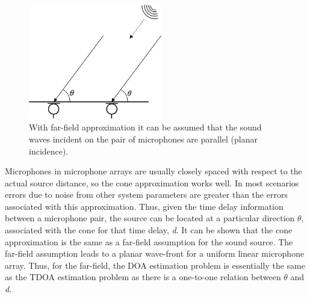\begin{figure}[H]
    \centering
    \includegraphics[width=0.52\textwidth]{Figures/farfieldtheta.png}
    \caption{With far-field approximation it can be assumed that the sound waves incident on the pair of microphones are parallel (planar incidence).}
    \label{fig:my_label}
\end{figure}

Microphones in microphone arrays are usually closely spaced with respect to the actual source distance, so the cone approximation works well. In most scenarios errors due to noise from other system parameters are greater than the errors associated with this approximation. Thus, given the time delay information between a microphone pair, the source can be located at a particular direction $\theta$, associated with the cone for that time delay, \textit{d}. It can be shown that the cone approximation is the same as a far-field assumption for the sound source. The far-field assumption leads to a planar wave-front for a uniform linear microphone array. Thus, for the far-field, the DOA estimation problem is essentially the same as the TDOA estimation problem as there is a one-to-one relation between $\theta$ and \textit{d}.



